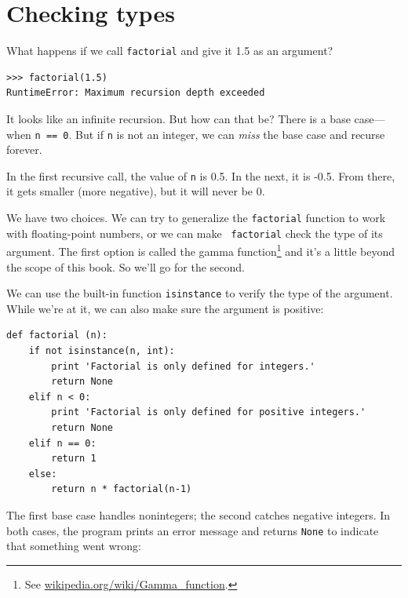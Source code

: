 \documentclass[10pt]{book}
\begin{document}


\section{Checking types}
\label{guardian}


What happens if we call {\tt factorial} and give it 1.5 as an argument?


\beforeverb
\begin{verbatim}
>>> factorial(1.5)
RuntimeError: Maximum recursion depth exceeded
\end{verbatim}
\afterverb
%
It looks like an infinite recursion.  But how can that be?  There is a
base case---when {\tt n == 0}.  But if {\tt n} is not an integer,
we can {\em miss} the base case and recurse forever.


In the first recursive call, the value of {\tt n} is 0.5.
In the next, it is -0.5.  From there, it gets smaller
(more negative), but it will never be 0.

We have two choices.  We can try to generalize the {\tt factorial}
function to work with floating-point numbers, or we can make {\tt
  factorial} check the type of its argument.  The first option is
called the gamma function\footnote{See
  \url{wikipedia.org/wiki/Gamma_function}.} and it's a
little beyond the scope of this book.  So we'll go for the second.


We can use the built-in function {\tt isinstance} to verify the type
of the argument.  While we're at it, we can also make sure the
argument is positive:


\beforeverb
\begin{verbatim}
def factorial (n):
    if not isinstance(n, int):
        print 'Factorial is only defined for integers.'
        return None
    elif n < 0:
        print 'Factorial is only defined for positive integers.'
        return None
    elif n == 0:
        return 1
    else:
        return n * factorial(n-1)
\end{verbatim}
\afterverb
%
The first base case handles nonintegers; the
second catches negative integers.  In both cases, the program prints
an error message and returns {\tt None} to indicate that something
went wrong:
\end{document}
